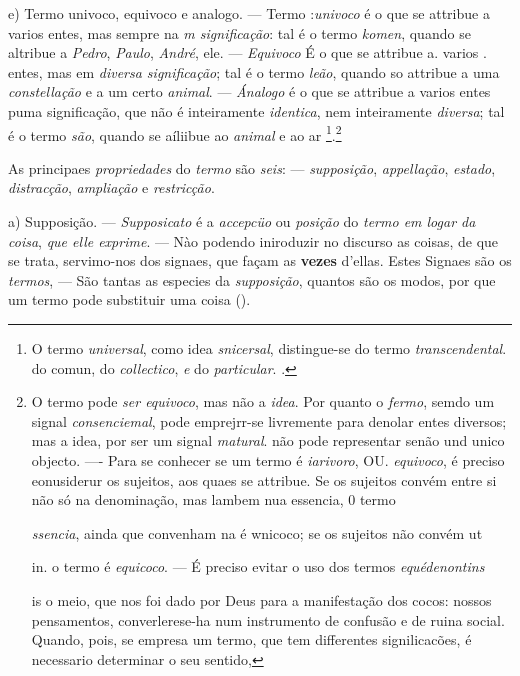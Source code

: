 e) Termo univoco, equivoco e analogo. --- Termo :\emph{univoco} é o que se attribue a varios entes, mas sempre na \emph{m significação}: tal é o termo \emph{komen}, quando se altribue a \emph{Pedro}, \emph{Paulo}, \emph{André}, ele. --- \emph{Equivoco} É o que se attribue a. varios . entes, mas em \emph{diversa significação}; tal é o termo \emph{leão}, quando so attribue a uma \emph{constellação} e a um certo \emph{animal}. --- \emph{Ánalogo} é o que se attribue a varios entes puma significação, que não é inteiramente \emph{identica}, nem inteiramente \emph{diversa}; tal é o termo \emph{são}, quando se aíliibue ao \emph{animal} e ao ar \footnote{O termo \emph{universal}, como idea \emph{snicersal}, distingue-se do termo \emph{transcendental}. do comun, do \emph{collectico}, \emph{e} do \emph{particular}. .}.\footnote{O termo pode \emph{ser equivoco}, mas não a \emph{idea}. Por quanto o \emph{fermo}, semdo um signal \emph{consenciemal}, pode emprejrr-se livremente para denolar entes diversos; mas a idea, por ser um signal \emph{matural}. não pode representar senão und unico objecto. ---- Para se conhecer se um termo é \emph{iarivoro}, OU. \emph{equivoco}, é preciso eonusiderur os sujeitos, aos quaes se attribue. Se os sujeitos convém entre si não só na denominação, mas lambem nua essencia, 0 termo\par \emph{ssencia}, ainda que convenham na é wnicoco; se os sujeitos não convém ut\par in. o termo é \emph{equicoco}. --- É preciso evitar o uso dos termos \emph{equédenontins}\par is o meio, que nos foi dado por Deus para a manifestação dos cocos: \textbar{} nossos pensamentos, converlerese-ha num instrumento de confusão e de ruina social. Quando, pois, se empresa um termo, que tem differentes signilicacões, é necessario determinar o seu sentido,}


  
As principaes \emph{propriedades} do \emph{termo} são \emph{seis}: --- \emph{supposição}, \emph{appellação}, \emph{estado}, \emph{distracção}, \emph{ampliação} e \emph{restricção}.

a) Supposição. --- \emph{Supposicato} é a \emph{accepcüo} ou \emph{posição} do \emph{termo em logar da coisa}, \emph{que elle exprime}. --- Nào podendo iniroduzir no discurso as coisas, de que se trata, servimo-nos dos signaes, que façam as \textbf{vezes} d'ellas. Estes Signaes são os \emph{termos}, --- São tantas as especies da \emph{supposição}, quantos são os modos, por que um termo pode substituir uma coisa ().

